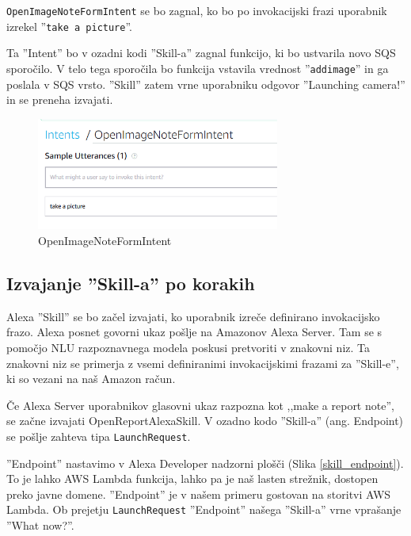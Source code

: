 \documentclass[a4paper, 12pt]{book}
\begin{document}
\texttt{OpenImageNoteFormIntent} se bo zagnal, ko bo po invokacijski frazi uporabnik izrekel ''\texttt{take a picture}''.

Ta ''Intent'' bo v ozadni kodi ''Skill-a'' zagnal funkcijo, ki bo ustvarila novo SQS sporočilo.
V telo tega sporočila bo funkcija vstavila vrednost ''\texttt{addimage}'' in ga poslala v SQS vrsto.
''Skill'' zatem vrne uporabniku odgovor ''Launching camera!'' in se preneha izvajati.

\begin{figure}[H]
\begin{center}
\includegraphics[width=8cm]{intent_image}
\end{center}
\caption{OpenImageNoteFormIntent}
\label{OpenImageNoteFormIntent}
\end{figure}

\subsection{Izvajanje ''Skill-a'' po korakih}

Alexa ''Skill'' se bo začel izvajati, ko uporabnik izreče definirano invokacijsko frazo.
Alexa posnet govorni ukaz pošlje na Amazonov Alexa Server.
Tam se s pomočjo NLU razpoznavnega modela poskusi pretvoriti v znakovni niz.
Ta znakovni niz se primerja z vsemi definiranimi invokacijskimi frazami za ''Skill-e'', ki so vezani na naš Amazon račun.

Če Alexa Server uporabnikov glasovni ukaz razpozna kot ,,make a report note'', se začne izvajati OpenReportAlexaSkill.
V ozadno kodo ''Skill-a'' (ang. Endpoint) se pošlje zahteva tipa \texttt{LaunchRequest}.

''Endpoint'' nastavimo v Alexa Developer nadzorni plošči (Slika \ref{skill_endpoint}).
To je lahko AWS Lambda funkcija, lahko pa je naš lasten strežnik, dostopen preko javne domene.
''Endpoint'' je v našem primeru gostovan na storitvi AWS Lambda.
Ob prejetju \texttt{LaunchRequest} ''Endpoint'' našega ''Skill-a'' vrne vprašanje ''What now?''.
\end{document}
